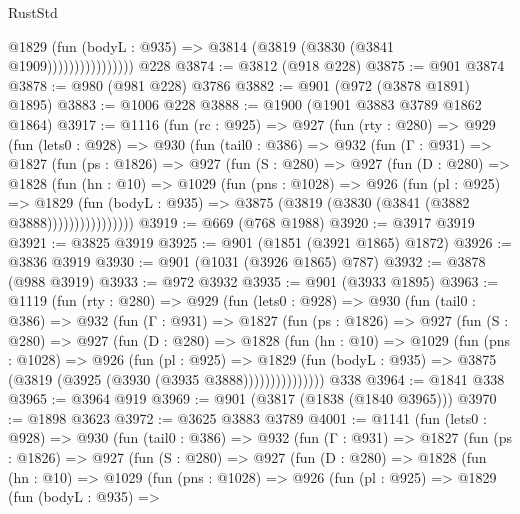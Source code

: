 \begin{lexlean}{RustStd}
\begin{coremodule}
{\begin{coremodule}
{{{{{{{{{{{{{{                          @1829
                            (fun (bodyL : @935) => @3814 (@3819 (@3830 (@3841 @1909))))))))))))))))
    @228
@3874 := @3812 (@918 @228)
@3875 := @901 @3874
@3878 := @980 (@981 @228) @3786
@3882 := @901 (@972 (@3878 @1891) @1895)
@3883 := @1006 @228
@3888 := @1900 (@1901 @3883 @3789 @1862 @1864)
@3917 := @1116
    (fun (rc : @925) =>
    @927
      (fun (rty : @280) =>
      @929
        (fun (lets0 : @928) =>
        @930
          (fun (tail0 : @386) =>
          @932
            (fun (Γ : @931) =>
            @1827
              (fun (ps : @1826) =>
              @927
                (fun (S : @280) =>
                @927
                  (fun (D : @280) =>
                  @1828
                    (fun (hn : @10) =>
                    @1029
                      (fun (pns : @1028) =>
                      @926
                        (fun (pl : @925) =>
                        @1829
                          (fun (bodyL : @935) =>
                          @3875 (@3819 (@3830 (@3841 (@3882 @3888))))))))))))))))
@3919 := @669 (@768 @1988)
@3920 := @3917 @3919
@3921 := @3825 @3919
@3925 := @901 (@1851 (@3921 @1865) @1872)
@3926 := @3836 @3919
@3930 := @901 (@1031 (@3926 @1865) @787)
@3932 := @3878 (@988 @3919)
@3933 := @972 @3932
@3935 := @901 (@3933 @1895)
@3963 := @1119
    (fun (rty : @280) =>
    @929
      (fun (lets0 : @928) =>
      @930
        (fun (tail0 : @386) =>
        @932
          (fun (Γ : @931) =>
          @1827
            (fun (ps : @1826) =>
            @927
              (fun (S : @280) =>
              @927
                (fun (D : @280) =>
                @1828
                  (fun (hn : @10) =>
                  @1029
                    (fun (pns : @1028) =>
                    @926
                      (fun (pl : @925) =>
                      @1829
                        (fun (bodyL : @935) =>
                        @3875 (@3819 (@3925 (@3930 (@3935 @3888)))))))))))))))
    @338
@3964 := @1841 @338
@3965 := @3964 @919
@3969 := @901 (@3817 (@1838 (@1840 @3965)))
@3970 := @1898 @3623
@3972 := @3625 @3883 @3789
@4001 := @1141
    (fun (lets0 : @928) =>
    @930
      (fun (tail0 : @386) =>
      @932
        (fun (Γ : @931) =>
        @1827
          (fun (ps : @1826) =>
          @927
            (fun (S : @280) =>
            @927
              (fun (D : @280) =>
              @1828
                (fun (hn : @10) =>
                @1029
                  (fun (pns : @1028) =>
                  @926
                    (fun (pl : @925) =>
                    @1829
                      (fun (bodyL : @935) =>
}}}}}}}}}}}}}}
\end{coremodule}}
\end{coremodule}
\end{lexlean}
